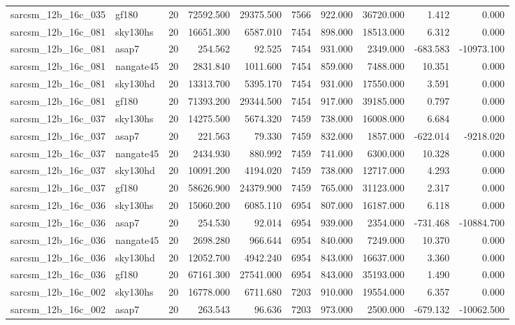 \documentclass{article}
\begin{document}
\begin{longtable}{llrrrrrrrr}
sarcsm\_12b\_16c\_035 & gf180 & 20 & 72592.500 & 29375.500 & 7566 & 922.000 & 36720.000 & 1.412 & 0.000 \\
sarcsm\_12b\_16c\_081 & sky130hs & 20 & 16651.300 & 6587.010 & 7454 & 898.000 & 18513.000 & 6.312 & 0.000 \\
sarcsm\_12b\_16c\_081 & asap7 & 20 & 254.562 & 92.525 & 7454 & 931.000 & 2349.000 & -683.583 & -10973.100 \\
sarcsm\_12b\_16c\_081 & nangate45 & 20 & 2831.840 & 1011.600 & 7454 & 859.000 & 7488.000 & 10.351 & 0.000 \\
sarcsm\_12b\_16c\_081 & sky130hd & 20 & 13313.700 & 5395.170 & 7454 & 931.000 & 17550.000 & 3.591 & 0.000 \\
sarcsm\_12b\_16c\_081 & gf180 & 20 & 71393.200 & 29344.500 & 7454 & 917.000 & 39185.000 & 0.797 & 0.000 \\
sarcsm\_12b\_16c\_037 & sky130hs & 20 & 14275.500 & 5674.320 & 7459 & 738.000 & 16008.000 & 6.684 & 0.000 \\
sarcsm\_12b\_16c\_037 & asap7 & 20 & 221.563 & 79.330 & 7459 & 832.000 & 1857.000 & -622.014 & -9218.020 \\
sarcsm\_12b\_16c\_037 & nangate45 & 20 & 2434.930 & 880.992 & 7459 & 741.000 & 6300.000 & 10.328 & 0.000 \\
sarcsm\_12b\_16c\_037 & sky130hd & 20 & 10091.200 & 4194.020 & 7459 & 738.000 & 12717.000 & 4.293 & 0.000 \\
sarcsm\_12b\_16c\_037 & gf180 & 20 & 58626.900 & 24379.900 & 7459 & 765.000 & 31123.000 & 2.317 & 0.000 \\
sarcsm\_12b\_16c\_036 & sky130hs & 20 & 15060.200 & 6085.110 & 6954 & 807.000 & 16187.000 & 6.118 & 0.000 \\
sarcsm\_12b\_16c\_036 & asap7 & 20 & 254.530 & 92.014 & 6954 & 939.000 & 2354.000 & -731.468 & -10884.700 \\
sarcsm\_12b\_16c\_036 & nangate45 & 20 & 2698.280 & 966.644 & 6954 & 840.000 & 7249.000 & 10.370 & 0.000 \\
sarcsm\_12b\_16c\_036 & sky130hd & 20 & 12052.700 & 4942.240 & 6954 & 843.000 & 16637.000 & 3.360 & 0.000 \\
sarcsm\_12b\_16c\_036 & gf180 & 20 & 67161.300 & 27541.000 & 6954 & 843.000 & 35193.000 & 1.490 & 0.000 \\
sarcsm\_12b\_16c\_002 & sky130hs & 20 & 16778.000 & 6711.680 & 7203 & 910.000 & 19554.000 & 6.357 & 0.000 \\
sarcsm\_12b\_16c\_002 & asap7 & 20 & 263.543 & 96.636 & 7203 & 973.000 & 2500.000 & -679.132 & -10062.500 \\

\end{longtable}
\end{document}
